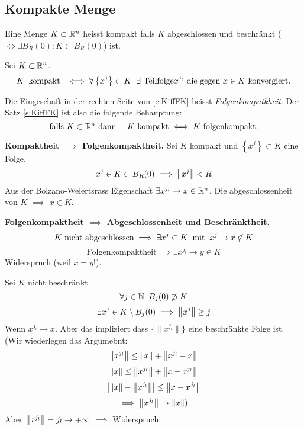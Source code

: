 \subsection{Kompakte Menge}
\begin{Def}
  Eine Menge $K\subset \mathbb{R}^n$ heisst kompakt falls $K$ abgeschlossen und beschränkt ($\iff \exists B_R(0):K\subset B_R(0)$) ist.
\end{Def}
\begin{Sat}\label{s:KiffFK}
  Sei $K\subset\mathbb{R}^n$.
 \begin{equation}\label{e:KiffFK}
K \hspace{2mm}\text{kompakt}\hspace{2mm} \iff\forall \left\{ x^j \right\}\subset K\hspace{2mm}\exists \mbox{ Teilfolge} x^{j_l}
\mbox{ die gegen $x\in K$ konvergiert.}
\end{equation}
\end{Sat}
Die Eingeschaft in der rechten Seite von \eqref{e:KiffFK} heisst {\em Folgenkompatkheit}.
Der Satz \ref{s:KiffFK} ist also die folgende Behauptung:
\[
\mbox{falls $K\subset \mathbb{R}^n$ dann }\quad \mbox{$K$ kompakt} \iff
\mbox{$K$ folgenkompakt.}
\]
\begin{Bew} {\bf Kompaktheit $\implies$ Folgenkompaktheit.}
Sei $K$ kompakt und $\left\{ x^j \right\}\subset K$ eine Folge.
  \[x^j\in K\subset B_R(0)\implies \left\| x^j \right\|<R\]
Aus der Bolzano-Weiertsrass Eigenschaft
  $\exists x^{j_l}\rightarrow x\in\mathbb{R}^n$. Die abgeschlossenheit von $K$ $\implies$ $x\in K$. 

\medskip

{\bf Folgenkompaktheit $\implies$ Abgeschlossenheit und Beschränktheit.}
  \[\text{$K$ nicht abgeschlossen}\implies \exists x^j\subset K\hspace{2mm}\text{mit}\hspace{2mm} x^j\rightarrow x \not\in K\]
  \[\text{Folgenkompaktheit}\implies \exists x^{j_l}\to y\in K\]
  Widerspruch (weil $x = y$!).

  Sei $K$ nicht beschränkt.
  \[\forall j\in\mathbb{N}\hspace{2mm} B_j(0)\not\supset K\]
  \[\exists x^j\in K\setminus B_j(0)\implies \left\| x^j \right\|\geq j\]
  Wenn $x^{j_l}\to x$. Aber das impliziert dass $\{\|x^{j_l}\|\}$ eine beschr\"ankte Folge
ist. (Wir wiederlegen das Argumebnt:
  \[\left\| x^{j_l} \right\|\leq \left\| x \right\|+\left\| x^{j_l}-x \right\|\]
  \[\left\| x \right\|\leq\left\| x^{j_l} \right\|+\left\| x-x^{j_l} \right\|\]
  \[\left| \left\| x \right\|-\left\| x^{j_l} \right\| \right|\leq\left\| x-x^{j_l} \right\|\]
  \[\implies\left\| x^{j_l} \right\|\rightarrow\left\| x \right\|)\]
Aber $\left\| x^{j_l} \right\|=j_l\rightarrow+\infty$ $\implies$ Widerspruch.
\end{Bew}
